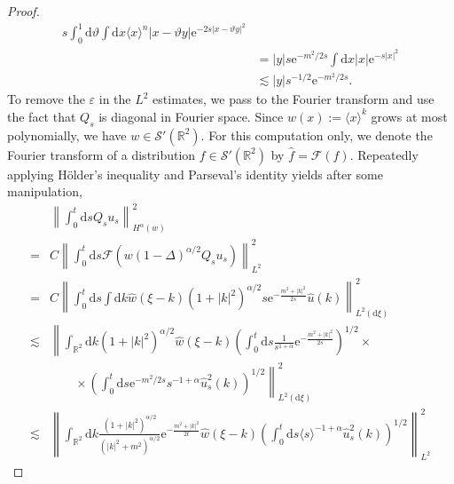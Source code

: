 \documentclass[11pt, a4paper]{scrartcl}
\numberwithin{equation}{section}
\theoremstyle{plain}
\theoremstyle{remark}
\newcommand{\assign}{:=}
\newcommand{\mathd}{\mathrm{d}}
\newcommand{\mathe}{\mathrm{e}}
\begin{document}
\begin{proof}
\[\begin{aligned}
{				s}  \int_0^1 \mathd \vartheta \int \mathd x \langle x \rangle^n | x -
			\vartheta y | \mathe^{- 2 s | x - \vartheta y |^2}                                                          \\
			                                        & = | y | s \mathe^{- m^2 / 2 s}  \int \mathd x | x | \mathe^{- s |
			x |^2}                                                                                                      \\
			                                        & \lesssim | y | s^{- 1 / 2} \mathe^{- m^2 / 2 s} .
		\end{aligned} \]
	To remove the $\varepsilon$ in the $L^2$ estimates, we pass to the Fourier
	transform and use the fact that $Q_s$ is diagonal in Fourier space. Since $w
		(x) \assign \langle x \rangle^k$ grows at most polynomially, we have $w \in
		\mathcal{S}' (\mathbb{R}^2)$. For this computation only, we denote the
	Fourier transform of a distribution $f \in \mathcal{S}' (\mathbb{R}^2)$ by
	$\hat{f} = \mathcal{F} (f)$. Repeatedly applying H{\"o}lder's inequality and
	Parseval's identity yields after some manipulation,
	{\small\begin{align*}
				         & \left\| \int_0^t \mathd s Q_s u_s \right\|_{H^{\alpha} (w)}^2      \\
				=        & C \left\| \int_0^t \mathd s \mathcal{F} (w (1 - \Delta)^{\alpha /
				2} Q_s u_s) \right\|^2_{L^2}                                                  \\
				=        & C \left\| \int_0^t \mathd s \int \mathd k \hat{w} (\xi - k) (1 + |
				k |^2)^{\alpha / 2} s \mathe^{- \frac{m^2 + | k |^2}{2 s}}  \hat{u} (k)
				\right\|_{L^2 (\mathd \xi)}^2                                                 \\
				\lesssim & \left\| \int_{\mathbb{R}^2} \mathd k (1 + | k |^2)^{\alpha /
						2}  \hat{w} (\xi - k) \left( \int_0^t \mathd s \frac{1}{s^{1 + \alpha}}
				\mathe^{- \frac{m^2 + | k |^2}{2 s}} \right)^{1 / 2} \times\right.            \\&\qquad\times \left. \left( \int_0^t
				\mathd s \mathe^{- m^2 / 2 s} s^{- 1 + \alpha} \hat{u}_s^2 (k)
				\right)^{1 / 2} \right\|_{L^2 (\mathd \xi)}^2                                 \\
				\lesssim & \left\| \int_{\mathbb{R}^2} \mathd k \frac{(1 + | k
					|^2)^{\alpha / 2}}{(| k |^2 + m^2)^{\alpha / 2}} \mathe^{- \frac{m^2 +
						| k |^2}{2 t}}  \hat{w} (\xi - k) \left( \int_0^t \mathd s \langle s
				\rangle^{- 1 + \alpha}  \hat{u}_s^2 (k) \right)^{1 / 2} \right\|^2_{L^2
}
\end{align*}}
\end{proof}
\end{document}
